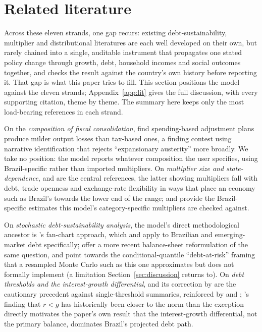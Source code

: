 \documentclass[11pt,a4paper]{article}
\begin{document}
\section{Related literature}
\label{sec:lit}

Across these eleven strands, one gap recurs: existing debt-sustainability, multiplier and distributional literatures are each well developed on their own, but rarely chained into a single, auditable instrument that propagates one stated policy change through growth, debt, household incomes and social outcomes together, and checks the result against the country's own history before reporting it. That gap is what this paper tries to fill. This section positions the model against the eleven strands; Appendix~\ref{app:lit} gives the full discussion, with every supporting citation, theme by theme. The summary here keeps only the most load-bearing references in each strand.

On the \emph{composition of fiscal consolidation}, \citet{alesinaardagna2010,alesinafaverogiavazzi2015} find spending-based adjustment plans produce milder output losses than tax-based ones, a finding \citet{guajardoleighpescatori2014} contest using narrative identification that rejects ``expansionary austerity'' more broadly. We take no position: the model reports whatever composition the user specifies, using Brazil-specific rather than imported multipliers. On \emph{multiplier size and state-dependence}, \citet{auerbachgorodnichenko2012} and \citet{ilzetzkimendozavegh2013} are the central references, the latter showing multipliers fall with debt, trade openness and exchange-rate flexibility in ways that place an economy such as Brazil's towards the lower end of the range; \citet{pires2014} and \citet{resendepires2021} provide the Brazil-specific estimates this model's category-specific multipliers are checked against.

On \emph{stochastic debt-sustainability analysis}, the model's direct methodological ancestor is \citet{celasundebrunostry2007}'s fan-chart approach, which \citet{garciarigobon2004} and \citet{karamhostland2005,karamhostland2006} apply to Brazilian and emerging-market debt specifically; \citet{levyyeyatisturzenegger2023} offer a more recent balance-sheet reformulation of the same question, and \citet{prasadetal2019growthatrisk,lianpresbiterowiriadinata2020} point towards the conditional-quantile ``debt-at-risk'' framing that a resampled Monte Carlo such as this one approximates but does not formally implement (a limitation Section~\ref{sec:discussion} returns to). On \emph{debt thresholds and the interest-growth differential}, \citet{reinhartrogoff2010} and its correction by \citet{herndonashpollin2014} are the cautionary precedent against single-threshold summaries, reinforced by \citet{egert2015} and \citet{panizzapresbitero2014}; \citet{blanchard2019}'s finding that $r<g$ has historically been closer to the norm than the exception directly motivates the paper's own result that the interest-growth differential, not the primary balance, dominates Brazil's projected debt path.
\end{document}
